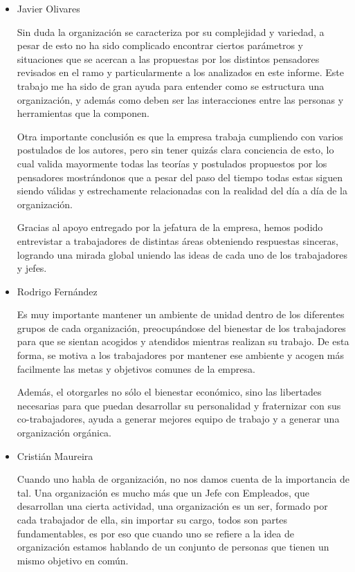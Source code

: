 
\begin{itemize}
	\item Javier Olivares

		Sin duda la organización se caracteriza por su complejidad y variedad, a pesar de esto no ha sido 
		complicado encontrar ciertos parámetros y situaciones que se acercan a las propuestas por los 
		distintos pensadores revisados en el ramo y particularmente a los analizados en este informe. 
		Este trabajo me ha sido de gran ayuda para entender como se estructura una organización, y además como 
		deben ser las interacciones entre las personas y herramientas que la componen. 
		
		Otra importante conclusión es que la empresa trabaja cumpliendo con varios postulados de los autores, pero
		sin tener quizás clara conciencia de esto, lo cual valida mayormente todas las teorías y postulados 
		propuestos por los pensadores mostrándonos que a pesar del paso del tiempo todas estas siguen siendo 
		válidas y estrechamente relacionadas con la realidad del día a día de la organización.
		
		Gracias al apoyo entregado por la jefatura de la empresa, hemos podido entrevistar a trabajadores de
		distintas áreas obteniendo respuestas sinceras, logrando una mirada global uniendo las ideas de cada uno de
		los trabajadores y jefes.

	\item Rodrigo Fernández

		Es muy importante mantener un ambiente de unidad dentro de los diferentes grupos de cada organización,
		preocupándose del bienestar de los trabajadores para que se sientan acogidos y atendidos mientras
		realizan su trabajo. De esta forma, se motiva a los trabajadores por mantener ese ambiente y acogen más
		facilmente las metas y objetivos comunes de la empresa.

		Además, el otorgarles no sólo el bienestar económico, sino las libertades necesarias para que puedan
		desarrollar su personalidad y fraternizar con sus co-trabajadores, ayuda a generar mejores equipo de
		trabajo y a generar una organización orgánica.

	\item Cristián Maureira
	
		Cuando uno habla de organización, no nos damos cuenta de la importancia de tal.
		Una organización es mucho más que un Jefe con Empleados, que desarrollan una cierta actividad,
		una organización es un ser, formado por cada trabajador de ella, sin importar su cargo,
		todos son partes fundamentables, es por eso que cuando uno se refiere a la idea de organización
		estamos hablando de un conjunto de personas que tienen un mismo objetivo en común.


\end{itemize}
